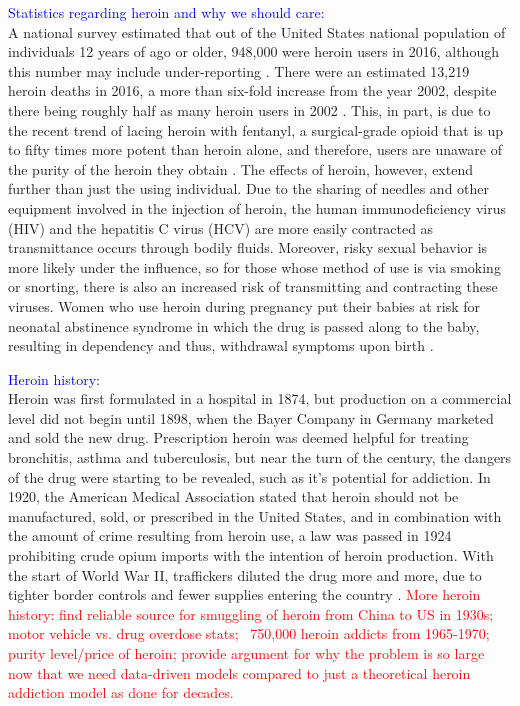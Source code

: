 \documentclass[12pt]{article}
\begin{document}
\textcolor{blue}{Statistics regarding heroin and why we should care:} \\
A national survey estimated that out of the United States national population of individuals 12 years of ago or older, 948,000 were heroin users in 2016, although this number may include under-reporting \cite{CDC2}. There were an estimated 13,219 heroin deaths in 2016, a more than six-fold increase from the year 2002, despite there being roughly half as many heroin users in 2002 \cite{NSDUH1}. This, in part, is due to the recent trend of lacing heroin with fentanyl, a surgical-grade opioid that is up to fifty times more potent than heroin alone, and therefore, users are unaware of the purity of the heroin they obtain \cite{CDC1, NIH2, Volkow2}. The effects of heroin, however, extend further than just the using individual. Due to the sharing of needles and other equipment involved in the injection of heroin, the human immunodeficiency virus (HIV) and the hepatitis C virus (HCV) are more easily contracted as transmittance occurs through bodily fluids. Moreover, risky sexual behavior is more likely under the influence, so for those whose method of use is via smoking or snorting, there is also an increased risk of transmitting and contracting these viruses. Women who use heroin during pregnancy put their babies at risk for neonatal abstinence syndrome in which the drug is passed along to the baby, resulting in dependency and thus, withdrawal symptoms upon birth \cite{NIDA2}. 

\textcolor{blue}{Heroin history:} \\
Heroin was first formulated in a hospital in 1874, but production on a commercial level did not begin until 1898, when the Bayer Company in Germany marketed and sold the new drug. Prescription heroin was deemed helpful for treating bronchitis, asthma and tuberculosis, but near the turn of the century, the dangers of the drug were starting to be revealed, such as it's potential for addiction. In 1920, the American Medical Association stated that heroin should not be manufactured, sold, or prescribed in the United States, and in combination with the amount of crime resulting from heroin use, a law was passed in 1924 prohibiting crude opium imports with the intention of heroin production. With the start of World War II, traffickers diluted the drug more and more, due to tighter border controls and fewer supplies entering the country \cite{UnitedNations}. \textcolor{red}{More heroin history: find reliable source for smuggling of heroin from China to US in 1930s; motor vehicle vs. drug overdose stats; ~750,000 heroin addicts from 1965-1970; purity level/price of heroin; provide argument for why the problem is so large now that we need data-driven models compared to just a theoretical heroin addiction model as done for decades.} 
\end{document}
